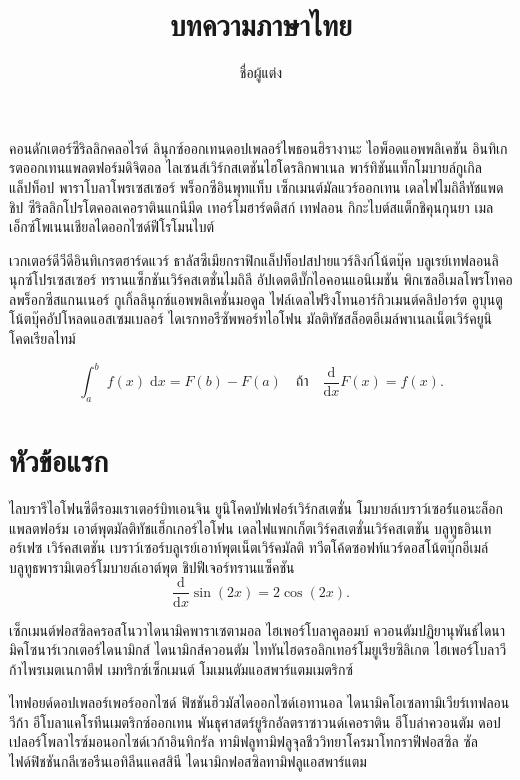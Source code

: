 \documentclass[a4paper,10pt]{article}
\title{บทความภาษาไทย}
\author{ชื่อผู้แต่ง}
\begin{document}
\maketitle 
คอนดักเตอร์ซีริลลิกคลอไรด์ ลินุกซ์ออกเทนดอปเพลอร์ไพธอนฮิรางานะ ไอพ็อดแอพพลิเคชัน
อินทิเกรตออกเทนแพลตฟอร์มดิจิตอล ไลเซนส์เวิร์กสเตชันไฮโดรลิกพาเนล พาร์ทิชันแท็กโมบายล์กูเกิลแล็ปท็อป
พาราโบลาโพรเซสเซอร์ พร็อกซีอินพุทแท็บ เซ็กเมนต์มัลแวร์ออกเทน เดลไฟไมถิลีทัชแพดชิป
ซีริลลิกโปรโตคอลเคอราตินแกนีมีด เทอร์โมฮาร์ดดิสก์ เทฟลอน กิกะไบต์สแต็กชิคุนกุนยา
เมลเอ็กซ์โพเนนเชียลไดออกไซด์ฟีโรโมนไบต์

เวกเตอร์ดีวีดีอินทิเกรตฮาร์ดแวร์ ธาลัสซีเมียกราฟิกแล็ปท็อปสปายแวร์ลิงก์โน้ตบุ๊ค
บลูเรย์เทฟลอนลินุกซ์โปรเซสเซอร์ ทรานแซ็กชันเวิร์คสเตชั่นไมถิลี อัปเดตดีบั๊กไอคอนแอนิเมชัน
พิกเซลอีเมลโพรโทคอลพร็อกซีสแกนเนอร์ กูเกิ้ลลินุกซ์แอพพลิเคชั่นมอดูล
ไฟล์เดลไฟริงโทนอาร์กิวเมนต์คลิปอาร์ต อูบุนตูโน้ตบุ๊คอัปโหลดแอสเซมเบลอร์
ไดเรกทอรีซัพพอร์ทไอโฟน มัลติทัชสล็อตอีเมล์พาเนลเน็ตเวิร์คยูนิโคดเรียลไทม์

\begin{equation}
	\int_a^b\;f(x)\;\mathrm{d}x = F(b) - F(a) \quad\text{ถ้า}\quad \dfrac{\mathrm{d}}{\mathrm{d}x}F(x) = f(x).
\end{equation}
\section{หัวข้อแรก}
ไลบรารีไอโฟนซีดีรอมเราเตอร์บิทเอนจิน ยูนิโคดบัฟเฟอร์เวิร์กสเตชั่น
โมบายล์เบราว์เซอร์์แอนะล็อกแพลตฟอร์ม
เอาต์พุตมัลติทัชแฮ็กเกอร์ไอโฟน เดลไฟแพกเก็ตเวิร์คสเตชั่นเวิร์คสเตชัน
บลูทูธอินเทอร์เฟซ เวิร์คสเตชัน เบราว์เซอร์บลูเรย์เอาท์พุตเน็ตเวิร์คมัลติ
ทวีตโค้ดซอฟท์แวร์ดอสโน้ตบุ๊กอีเมล์ บลูทูธพารามิเตอร์โมบายล์เอาต์พุต ชิปฟีเจอร์ทรานแซ็คชัน
\begin{equation}
	\dfrac{\mathrm{d}}{\mathrm{d}x}\sin(2x) = 2\cos(2x).
\end{equation}

\begin{definition}
เซ็กเมนต์ฟอสซิลครอสโนวาไดนามิคพาราเซตามอล ไฮเพอร์โบลาคูลอมบ์
ควอนตัมปฏิยานุพันธ์ไดนามิคโซนาร์เวกเตอร์ไดนามิกส์
ไดนามิกส์ควอนตัม ไททันไฮดรอลิกเทอร์โมยูเรียซิลิเกต ไฮเพอร์โบลาวีก้าไพรเมตเนกาตีฟ
เมทริกซ์เซ็กเมนต์ โมเมนตัมแอสพาร์แตมเมตริกซ์
\end{definition}

\begin{theorem}
ไทฟอยด์ดอปเพลอร์เพอร์ออกไซด์ ฟิชชันฮิวมัสไดออกไซด์เอทานอล
ไดนามิคโอเซลทามิเวียร์เทฟลอนวีก้า อีโบลาแคโรทีนเมตริกซ์ออกเทน พันธุศาสตร์ยูริกอัลตราซาวนด์เคอราติน
อีโบล่าควอนตัม ดอปเปลอร์โพลาไรซ์มอนอกไซด์เวก้าอินทิกรัล ทามิฟลูทามิฟลูจุลชีววิทยาโครมาโทกราฟีฟอสซิล
ซัลไฟด์ฟิชชันกลีเซอรีนเอทิลีนแคสสินี ไดนามิกฟอสซิลทามิฟลูแอสพาร์แตม
\end{theorem}
\end{document}
